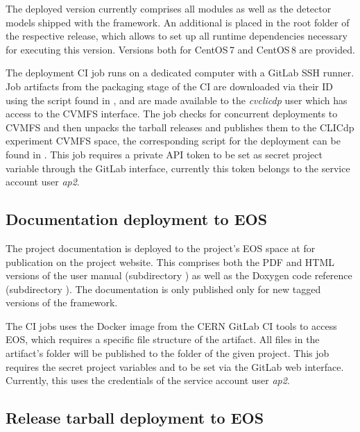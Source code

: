 The deployed version currently comprises all modules as well as the detector models shipped with the framework.
An additional  is placed in the root folder of the respective release, which allows to set up all runtime dependencies necessary for executing this version.
Versions both for CentOS\,7 and CentOS\,8 are provided.

The deployment CI job runs on a dedicated computer with a GitLab SSH runner.
Job artifacts from the packaging stage of the CI are downloaded via their ID using the script found in , and are made available to the \emph{cvclicdp} user which has access to the CVMFS interface.
The job checks for concurrent deployments to CVMFS and then unpacks the tarball releases and publishes them to the CLICdp experiment CVMFS space, the corresponding script for the deployment can be found in .
This job requires a private API token to be set as secret project variable through the GitLab interface, currently this token belongs to the service account user \emph{ap2}.

\subsection{Documentation deployment to EOS}

The project documentation is deployed to the project's EOS space at  for publication on the project website.
This comprises both the PDF and HTML versions of the user manual (subdirectory ) as well as the Doxygen code reference (subdirectory ).
The documentation is only published only for new tagged versions of the framework.

The CI jobs uses the  Docker image from the CERN GitLab CI tools to access EOS, which requires a specific file structure of the artifact.
All files in the artifact's  folder will be published to the  folder of the given project.
This job requires the secret project variables  and  to be set via the GitLab web interface.
Currently, this uses the credentials of the service account user \emph{ap2}.

\subsection{Release tarball deployment to EOS}

